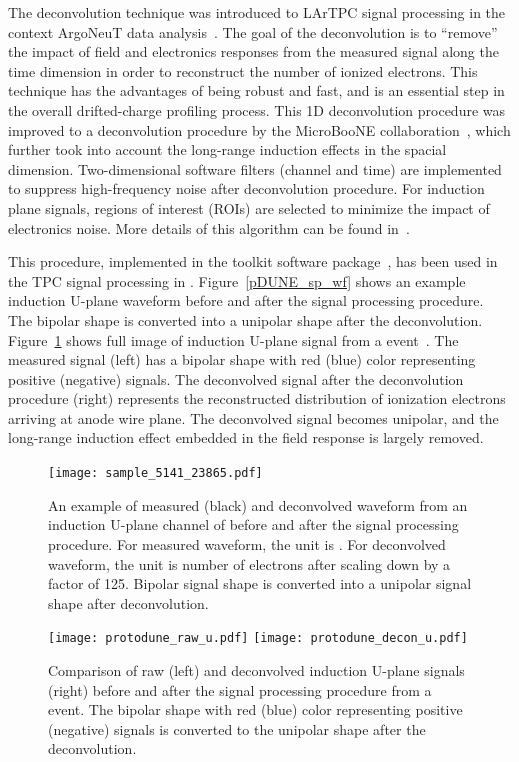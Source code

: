 The deconvolution technique was introduced to LArTPC signal processing in the context ArgoNeuT 
data analysis~\cite{Baller:2017ugz}. The goal of the deconvolution is to ``remove'' the impact of field and 
electronics responses from the measured signal along the time dimension in order to reconstruct the number of ionized
electrons. This technique has the advantages of being robust and fast, and is an essential step in the overall drifted-charge profiling process. This 1D deconvolution procedure was improved to a \twod deconvolution procedure 
by the MicroBooNE collaboration~\cite{Adams:2018dra,Adams:2018gbi}, which further took into account the long-range 
induction effects in the spacial dimension. Two-dimensional software filters (channel and time) are implemented to 
suppress high-frequency noise after deconvolution procedure. For induction plane signals, regions of interest 
(ROIs) are selected to minimize the impact of electronics noise. More details of this algorithm can be found in~\cite{Adams:2018dra}.

This procedure, implemented in the  toolkit software package~\cite{ref:wire_cell_toolkit},  has been used in the TPC signal processing in . Figure~\ref{pDUNE_sp_wf}
shows an example induction U-plane waveform before and after the signal processing procedure. The bipolar 
shape is converted into a unipolar shape after the \twod deconvolution. Figure~\ref{pDUNE_sp_example}
shows full \twod image of induction U-plane signal from a  
event~\cite{ref:pdune_signal_processing}. The measured signal (left) has a bipolar shape with red (blue) color 
representing positive (negative) signals. The deconvolved signal after 
the \twod deconvolution procedure (right) represents the reconstructed 
distribution of ionization electrons arriving at anode wire plane. The 
deconvolved signal becomes unipolar, and the long-range 
induction effect embedded in the field response is largely removed. 


\begin{figure}[!h!tbp]
\centering
\texttt{[image: sample\_5141\_23865.pdf]}
\caption[Measured and deconvolved waveform from an induction U-plane channel of ]{An example of measured (black) and deconvolved waveform from an induction U-plane channel of 
before and after the signal processing procedure. For measured waveform, the unit is . For deconvolved
waveform, the unit is number of electrons after scaling down by a factor of 125.
Bipolar signal shape is converted into a unipolar signal shape after \twod deconvolution.}
\label{pDUNE_sp_wf}
\texttt{[image: protodune\_raw\_u.pdf]}
\texttt{[image: protodune\_decon\_u.pdf]}
\caption{Comparison of raw (left) and deconvolved induction U-plane signals (right) before and after 
the signal processing procedure from a  event. The bipolar shape with red (blue) color representing
positive (negative) signals is converted to the unipolar shape after the \twod deconvolution. }
\label{pDUNE_sp_example}
\end{figure}


